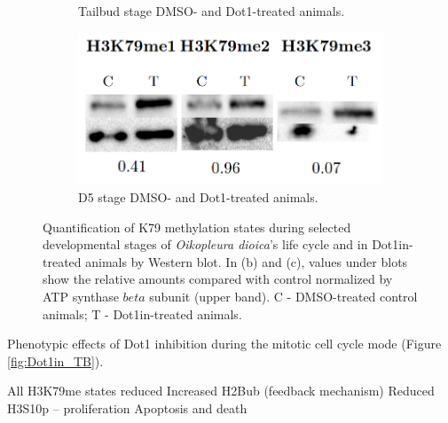 \documentclass[11pt,twoside,a4paper]{report}
\begin{document}
\begin{figure}
\begin{subfigure}{.5\textwidth}
			\caption{Tailbud stage DMSO- and Dot1-treated animals.}
		\end{subfigure}
		\begin{subfigure}{.5\textwidth}
			\centering
			\includegraphics[width=1\linewidth]{pngs/D5_Dot1_in.png}
			\caption{D5 stage DMSO- and Dot1-treated animals.}
		\end{subfigure}
		\caption{Quantification of K79 methylation states during selected developmental stages of \textit{Oikopleura dioica}'s life cycle and in Dot1in-treated animals by Western blot.
			{\footnotesize
				In (b) and (c), values under blots show the relative amounts compared with control normalized by ATP synthase $beta$ subunit (upper band). C - DMSO-treated control animals; T - Dot1in-treated animals.
			}
		}
		\label{fig:k79me}
	\end{figure}
	
	Phenotypic effects of Dot1 inhibition during the mitotic cell cycle mode (Figure \ref{fig:Dot1in_TB}).
	
	All H3K79me states reduced
	Increased H2Bub (feedback mechanism)
	Reduced H3S10p – proliferation
	Apoptosis and death
	
\end{document}

